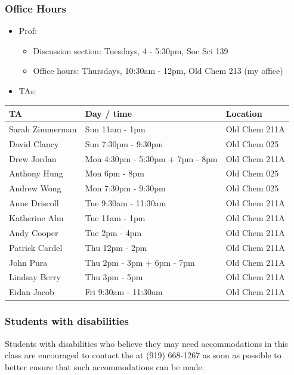 \documentclass[slidestop,compress,mathserif,12pt,t,professionalfonts,xcolor=table]{beamer}
\begin{document}
\begin{frame}[shrink]
\frametitle{Office Hours}

\begin{itemize}
\item Prof:
\begin{itemize}
\item Discussion section: Tuesdays, 4 - 5:30pm, Soc Sci 139
\item Office hours: Thursdays, 10:30am - 12pm, Old Chem 213 (my office)
\end{itemize}
\item TAs: 
\end{itemize}
{\small
{}
\begin{tabular}{l | l | l}
TA				& Day / time						& Location \\
\hline
Sarah Zimmerman	& Sun 11am - 1pm					& Old Chem 211A \\
David Clancy		& Sun 7:30pm - 9:30pm				& Old Chem 025 \\
Drew Jordan		& Mon 4:30pm - 5:30pm + 7pm - 8pm	& Old Chem 211A \\
Anthony Hung		& Mon 6pm - 8pm					& Old Chem 025 \\
Andrew Wong		& Mon 7:30pm - 9:30pm				& Old Chem 025 \\ 
Anne Driscoll		& Tue 9:30am - 11:30am				& Old Chem 211A \\
Katherine Ahn		& Tue 11am - 1pm					& Old Chem 211A \\
Andy Cooper		& Tue 2pm - 4pm					& Old Chem 211A \\
Patrick Cardel 		& Thu 12pm - 2pm					& Old Chem 211A \\
John Pura			& Thu 2pm - 3pm + 6pm - 7pm			& Old Chem 211A \\
Lindsay Berry		& Thu 3pm - 5pm					& Old Chem 211A \\
Eidan Jacob		& Fri 9:30am - 11:30am				& Old Chem 211A
\end{tabular}
}

\end{frame}


\begin{frame}
\frametitle{Students with disabilities}

Students with disabilities who believe they may need accommodations in this class are 
encouraged to contact the 
 at (919) 668-1267 as soon as possible to better ensure that such 
accommodations can be made.

\vfill


\end{frame}
\end{document}
